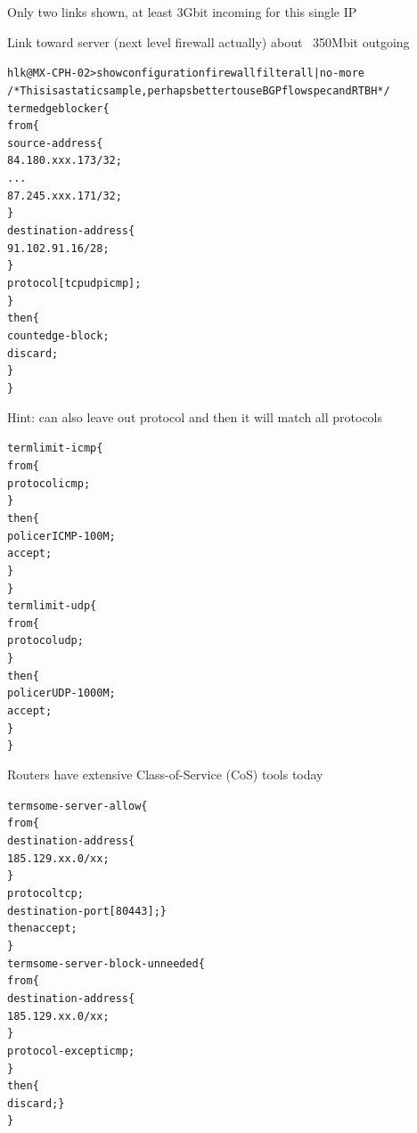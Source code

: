 \documentclass[Screen16to9,17pt]{foils}
\begin{document}
\myquestionspage







\centerline{Only two links shown, at least 3Gbit incoming for this single IP}

\centerline{Link toward server (next level firewall actually) about ~350Mbit outgoing}



\begin{alltt}\footnotesize
hlk@MX-CPH-02> show configuration firewall filter all | no-more
/* This is a static sample, perhaps better to use BGP flowspec and RTBH */
term edgeblocker \{
    from \{
        source-address \{
            84.180.xxx.173/32;
...
            87.245.xxx.171/32;
        \}
        destination-address \{
            91.102.91.16/28;
        \}
        protocol [ tcp udp icmp ];
    \}
    then \{
        count edge-block;
        discard;
    \}
\}
\end{alltt}
Hint: can also leave out protocol and then it will match all protocols


\begin{alltt}\footnotesize
term limit-icmp \{
    from \{
        protocol icmp;
    \}
    then \{
        policer ICMP-100M;
        accept;
    \}
\}
term limit-udp \{
    from \{
        protocol udp;
    \}
    then \{
        policer UDP-1000M;
        accept;
    \}
\}
\end{alltt}

Routers have extensive Class-of-Service (CoS) tools today


\begin{alltt}\footnotesize
term some-server-allow \{
    from \{
        destination-address \{
            185.129.xx.0/xx;
        \}
        protocol tcp;
        destination-port [ 80 443 ];    \}
    then accept;
\}
term some-server-block-unneeded \{
    from \{
        destination-address \{
            185.129.xx.0/xx;
        \}
        protocol-except icmp;
    \}
    then \{
        discard;    \}
\}
\end{alltt}
\end{document}
